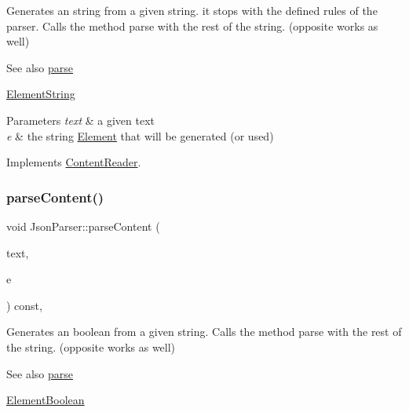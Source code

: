 Generates an string from a given string. it stops with the defined rules of the parser. Calls the method parse with the rest of the string. (opposite works as well) \begin{DoxySeeAlso}{See also}
\mbox{\hyperlink{classJsonParser_a3ec3a9fcc8a63f987b4749d60b0568df}{parse}} 

\mbox{\hyperlink{classElementString}{Element\+String}}
\end{DoxySeeAlso}

\begin{DoxyParams}{Parameters}
{\em text} & a given text \\
\hline
{\em e} & the string \mbox{\hyperlink{classElement}{Element}} that will be generated (or used) \\
\hline
\end{DoxyParams}


Implements \mbox{\hyperlink{classContentReader_a310678ddc37a05aca2f13db73b22abe5}{Content\+Reader}}.

\mbox{\label{classJsonParser_a0857f5d286e5f0b973e2791e5e7a4e83}} 
\subsubsection{\texorpdfstring{parse\+Content()}{parseContent()}\hspace{0.1cm}{\footnotesize\ttfamily [3/6]}}
{\footnotesize\ttfamily void Json\+Parser\+::parse\+Content (\begin{DoxyParamCaption}\item[{std\+::string \&}]{text,  }\item[{\mbox{\hyperlink{classElementBoolean}{Element\+Boolean}} $\ast$}]{e }\end{DoxyParamCaption}) const\hspace{0.3cm}{\ttfamily [override]}, {\ttfamily [virtual]}}

Generates an boolean from a given string. Calls the method parse with the rest of the string. (opposite works as well) \begin{DoxySeeAlso}{See also}
\mbox{\hyperlink{classJsonParser_a3ec3a9fcc8a63f987b4749d60b0568df}{parse}} 

\mbox{\hyperlink{classElementBoolean}{Element\+Boolean}}
\end{DoxySeeAlso}

